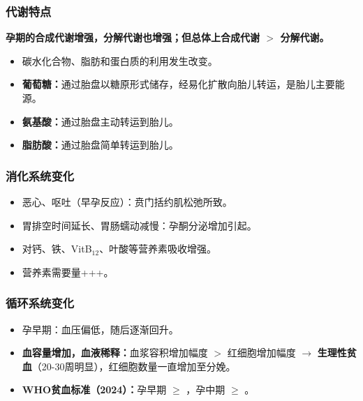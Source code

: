 \subsubsection{代谢特点}

\begin{keybox}
\textbf{孕期的合成代谢增强，分解代谢也增强；但总体上合成代谢 $>$ 分解代谢。}
\begin{itemize}[leftmargin=*]
    \item 碳水化合物、脂肪和蛋白质的利用发生改变。
    \item \textbf{葡萄糖：}通过胎盘以糖原形式储存，经易化扩散向胎儿转运，是胎儿主要能源。
    \item \textbf{氨基酸：}通过胎盘主动转运到胎儿。
    \item \textbf{脂肪酸：}通过胎盘简单转运到胎儿。
\end{itemize}
\end{keybox}

\subsubsection{消化系统变化}

\begin{keybox}
\begin{itemize}[leftmargin=*]
    \item 恶心、呕吐（早孕反应）：贲门括约肌松弛所致。
    \item 胃排空时间延长、胃肠蠕动减慢：孕酮分泌增加引起。
    \item 对钙、铁、VitB$_{12}$、叶酸等营养素吸收增强。
    \item 营养素需要量+++。
\end{itemize}
\end{keybox}

\subsubsection{循环系统变化}

\begin{keybox}
\begin{itemize}[leftmargin=*]
    \item 孕早期：血压偏低，随后逐渐回升。
    \item \textbf{血容量增加，血液稀释：}血浆容积增加幅度 $>$ 红细胞增加幅度 $\rightarrow$ \textbf{生理性贫血}（20-30周明显），红细胞数量一直增加至分娩。
    \item \textbf{WHO贫血标准（2024）：}孕早期 $\geq$ ，孕中期 $\geq$ 。
\end{itemize}
\end{keybox}

